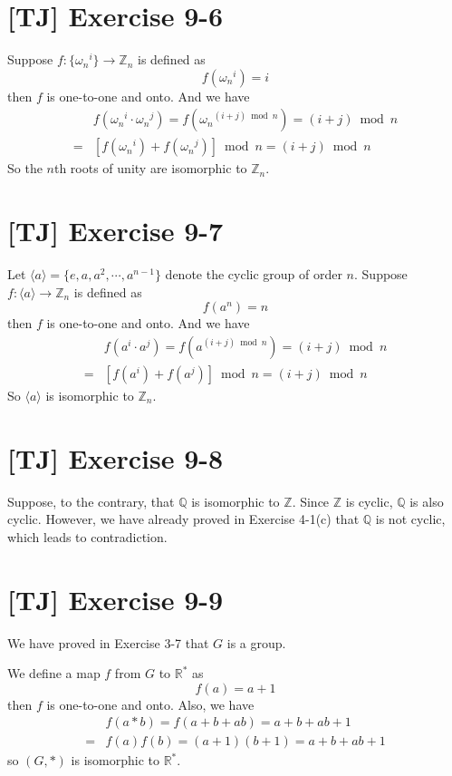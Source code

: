 \documentclass[a4paper,11pt,twocolumn]{article}
\begin{document}
  \section{[TJ] Exercise 9-6}
  Suppose $f: \{{\omega_n}^i\} \rightarrow \mathbb{Z}_n$ is defined as
   $$ f({\omega_n}^i) = i $$
  then $f$ is one-to-one and onto. And we have
  \begin{align*}
    & f({\omega_n}^i \cdot {\omega_n}^j) = f({\omega_n}^{(i+j) \bmod n}) = (i+j) \bmod n \\
   =& [f({\omega_n}^i) + f({\omega_n}^j)] \bmod n = (i + j) \bmod n
  \end{align*}
  So the $n$th roots of unity are isomorphic to $\mathbb{Z}_n$.

  \section{[TJ] Exercise 9-7}
  Let $\langle a \rangle = \{e, a, a^2, \cdots, a^{n-1}\}$ denote the cyclic group of order $n$. Suppose $f: \langle a \rangle \rightarrow \mathbb{Z}_n$ is defined as
  $$ f(a^n) = n $$
  then $f$ is one-to-one and onto. And we have
  \begin{align*}
    & f(a^i \cdot a^j) = f(a^{(i+j) \bmod n}) = (i+j) \bmod n\\
   =& [f(a^i) + f(a^j)] \bmod n = (i + j) \bmod n
  \end{align*}
  So $\langle a \rangle$ is isomorphic to $\mathbb{Z}_n$.

  \section{[TJ] Exercise 9-8}
  Suppose, to the contrary, that $\mathbb{Q}$ is isomorphic to $\mathbb{Z}$. Since $\mathbb{Z}$ is cyclic, $\mathbb{Q}$ is also cyclic. However, we have already proved in Exercise 4-1(c) that $\mathbb{Q}$ is not cyclic, which leads to contradiction.

  \section{[TJ] Exercise 9-9}
  We have proved in Exercise 3-7 that $G$ is a group. \par
  We define a map $f$ from $G$ to $\mathbb{R}^*$ as
  $$ f(a) = a + 1 $$
  then $f$ is one-to-one and onto. Also, we have
  \begin{align*}
    & f(a * b) = f(a + b + ab) = a+b+ab+1 \\
    =& f(a)f(b) = (a+1)(b+1) = a+b+ab+1
  \end{align*}
  so $(G, *)$ is isomorphic to $\mathbb{R}^*$.
\end{document}
